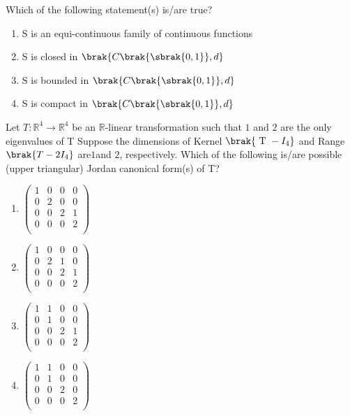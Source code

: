 Which of the following statement(s) is/are true?
\begin{enumerate}
    \item S is an equi-continuous family of continuous functions
    \item S is closed in $\brak{C\brak{\sbrak{0,1}},d}$
    \item S is bounded in $\brak{C\brak{\sbrak{0,1}},d}$
    \item S is compact in $\brak{C\brak{\sbrak{0,1}},d}$
\end{enumerate}
\bigskip
\item Let $T:\mathbb{R}^{4}\to\mathbb{R}^{4}$ be an $\mathbb{R}$-linear transformation such that $1$ and $2$ are the only eigenvalues of T Suppose the dimensions of Kernel $\brak{\text{ T }-I_{4}}$ and  Range$\brak{T-2 I_{4}}$
are$ 1 $and $2$, respectively. Which of the following is/are possible (upper triangular) Jordan canonical form(s) of T?
\begin{enumerate}
    \item $\begin{pmatrix}
1 & 0 & 0 & 0 \\
0 & 2 & 0 & 0 \\
0 & 0 & 2 & 1 \\
0 & 0 & 0 & 2 \\
\end{pmatrix}$
\item $\begin{pmatrix}
1 & 0 & 0 & 0 \\
0 & 2 & 1 & 0 \\
0 & 0 & 2 & 1 \\
0 & 0 & 0 & 2 \\
\end{pmatrix}$
\item $\begin{pmatrix}
1 & 1 & 0 & 0 \\
0 & 1 & 0 & 0 \\
0 & 0 & 2 & 1 \\
0 & 0 & 0 & 2 \\
\end{pmatrix}$
\item $\begin{pmatrix}
1 & 1 & 0 & 0 \\
0 & 1 & 0 & 0 \\
0 & 0 & 2 & 0 \\
0 & 0 & 0 & 2 \\
\end{pmatrix}$

\end{enumerate}
